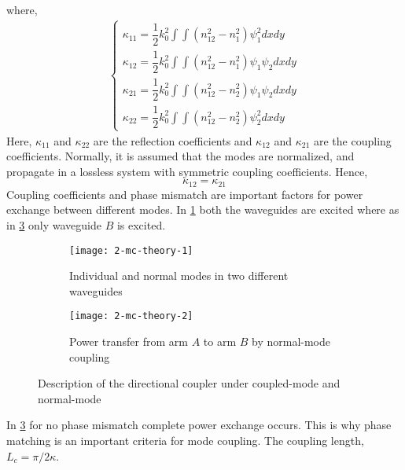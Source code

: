 \documentclass[../report.tex]{subfiles}
\begin{document}
where,
\begin{equation}\label{eq:coupled_mode_coupling_coeff}
\begin{aligned}
\begin{cases}
\kappa_{11} = \dfrac{1}{2}k_0^2\int\int(n_{12}^2-n_{1}^2)\psi_1^2dxdy \\[10pt]
\kappa_{12} = \dfrac{1}{2}k_0^2\int\int(n_{12}^2-n_{1}^2)\psi_1\psi_2 dxdy \\[10pt]
\kappa_{21} = \dfrac{1}{2}k_0^2\int\int(n_{12}^2-n_{2}^2)\psi_1\psi_2 dxdy \\[10pt]
\kappa_{22} = \dfrac{1}{2}k_0^2\int\int(n_{12}^2-n_{2}^2)\psi_2^2 dxdy
\end{cases}
\end{aligned}
\end{equation}	
Here, $\kappa_{11}$ and $\kappa_{22}$ are the reflection coefficients and $\kappa_{12}$ and $\kappa_{21}$ are the coupling coefficients. Normally, it is assumed that the modes are normalized, and propagate in a lossless system with symmetric coupling coefficients. Hence,
\begin{equation}\label{eq:symmetric_coupling_coeff}
\kappa_{12} = \kappa_{21} 
\end{equation}
Coupling coefficients and phase mismatch are important factors for power exchange between different modes. In \ref{fig:2_mc_theory_1} both the waveguides are excited where as in \ref{fig:2_mc_theory_2} only waveguide $B$ is excited.
\begin{figure}[H]
	\begin{subfigure}[t]{0.45\textwidth}
		\texttt{[image: 2-mc-theory-1]}
		\caption{Individual and normal modes in two different waveguides}
		\label{fig:2_mc_theory_1}
	\end{subfigure}
	\hfill
	\begin{subfigure}[t]{0.45\textwidth}
		\texttt{[image: 2-mc-theory-2]}
		\caption{Power transfer from arm $A$ to arm $B$ by normal-mode coupling}
		\label{fig:2_mc_theory_2}
	\end{subfigure}
	\caption{Description of the directional coupler under coupled-mode and normal-mode}
\end{figure}

\noindent In \ref{fig:2_mc_theory_2} for no phase mismatch complete power exchange occurs. This is why phase matching is an important criteria for mode coupling. The coupling length, $L_c = \pi / 2\kappa$. 
\end{document}
